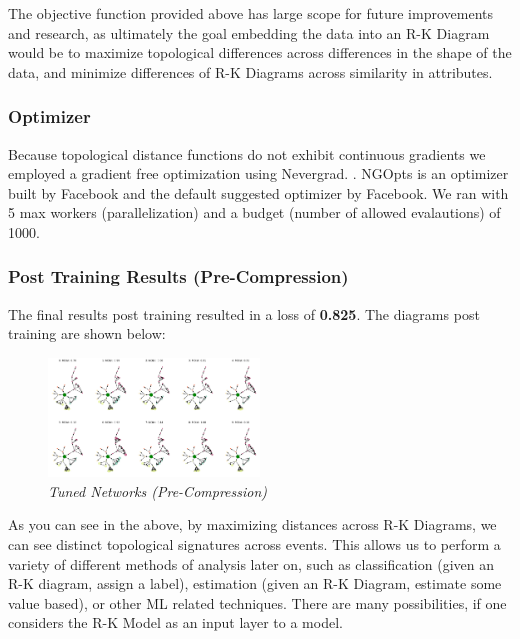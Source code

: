 The objective function provided above has large scope for future improvements and research, as ultimately the goal embedding the data into an R-K Diagram would be to maximize topological differences across differences in the shape of the data, and minimize differences of R-K Diagrams across similarity in attributes.

\subsubsection{Optimizer}
\label{sec:Optimizer}

Because topological distance functions do not exhibit continuous gradients we employed a gradient free optimization using Nevergrad. \cite{a2020_nevergrad}. NGOpts is an optimizer built by Facebook and the default suggested optimizer by Facebook. We ran with 5 max workers (parallelization) and a budget (number of allowed evalautions) of 1000.

\subsubsection{Post Training Results (Pre-Compression)}

The final results post training resulted in a loss of \textbf{0.825}. The diagrams post training are shown below:

\begin{figure}[H]
	\centering
        \includegraphics[width=0.5\textwidth]{images/store_sales_trained_data.png}
	\caption{\textit{Tuned Networks (Pre-Compression)}}
	\label{fig:fig5}
\end{figure}

As you can see in the above, by maximizing distances across R-K Diagrams, we can see distinct topological signatures across events. This allows us to perform a variety of different methods of analysis later on, such as classification (given an R-K diagram, assign a label), estimation (given an R-K Diagram, estimate some value based), or other ML related techniques. There are many possibilities, if one considers the R-K Model as an input layer to a model.

